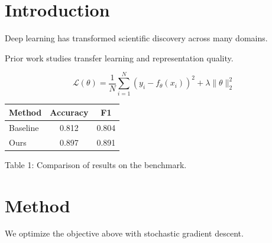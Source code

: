 \documentclass[11pt]{article}
\begin{document}
\section{Introduction}
Deep learning has transformed scientific discovery across many domains.

Prior work studies transfer learning and representation quality.

\begin{equation}
\mathcal{L}(\theta)=\frac{1}{N}\sum_{i=1}^{N}\left(y_i-f_\theta(x_i)\right)^2+\lambda\|\theta\|_2^2
\end{equation}

\begin{center}
\begin{tabular}{|l|c|c|}
\hline
Method & Accuracy & F1 \\
\hline
Baseline & 0.812 & 0.804 \\
\hline
Ours & 0.897 & 0.891 \\
\hline
\end{tabular}
\end{center}
\noindent Table 1: Comparison of results on the benchmark.

\section{Method}
We optimize the objective above with stochastic gradient descent.
\end{document}
